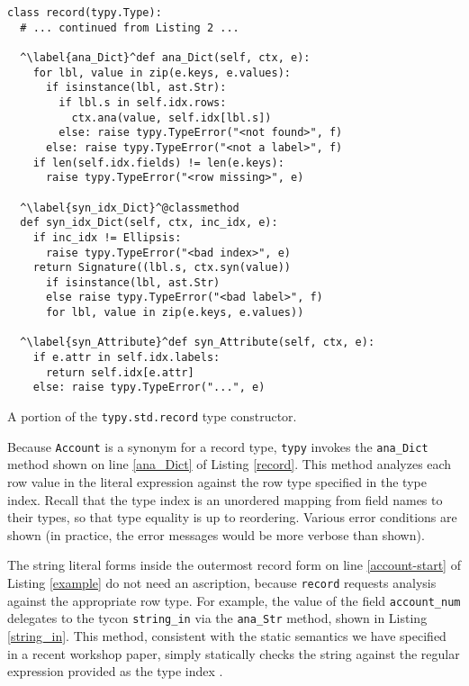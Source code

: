 \documentclass[preprint,10pt]{sigplanconf}
\newcommand{\lip}[1]{\lstinline[language=Python,basicstyle=\ttfamily\small,deletendkeywords={tuple,buffer,map}]{#1}}
\begin{document}
\begin{codelisting}[t]
\begin{lstlisting}
class record(typy.Type): 
  # ... continued from Listing 2 ...

  ^\label{ana_Dict}^def ana_Dict(self, ctx, e):
    for lbl, value in zip(e.keys, e.values):
      if isinstance(lbl, ast.Str):
        if lbl.s in self.idx.rows: 
          ctx.ana(value, self.idx[lbl.s])
        else: raise typy.TypeError("<not found>", f)
      else: raise typy.TypeError("<not a label>", f)
    if len(self.idx.fields) != len(e.keys): 
      raise typy.TypeError("<row missing>", e)

  ^\label{syn_idx_Dict}^@classmethod
  def syn_idx_Dict(self, ctx, inc_idx, e):
    if inc_idx != Ellipsis: 
      raise typy.TypeError("<bad index>", e)
    return Signature((lbl.s, ctx.syn(value))
      if isinstance(lbl, ast.Str)
      else raise typy.TypeError("<bad label>", f)
      for lbl, value in zip(e.keys, e.values))

  ^\label{syn_Attribute}^def syn_Attribute(self, ctx, e):
    if e.attr in self.idx.labels: 
      return self.idx[e.attr]
    else: raise typy.TypeError("...", e)
\end{lstlisting}
%
\caption{A portion of the \texttt{typy.std.record} type constructor.}
\label{record}
\end{codelisting}

Because \lip{Account} is a synonym for a record type, \verb|typy| invokes the \lip{ana_Dict} method shown on line \ref{ana_Dict} of Listing \ref{record}. This method analyzes each row value in the literal expression against the row type specified in the type index. Recall that the type index is an unordered mapping from field names to their types, so that type equality is up to reordering. Various error conditions are shown (in practice, the error messages would be more verbose than shown).

The string literal forms inside the outermost record form on line \ref{account-start} of Listing \ref{example} do not need an ascription, because \lip{record} requests analysis against the appropriate row type. For example, the value of the field \lip{account_num} delegates to the tycon \lip{string_in} via the \lip{ana_Str} method, shown in Listing \ref{string_in}. This method, consistent with the static semantics we have specified in a recent workshop paper, simply statically checks the string against the regular expression provided as the type index \cite{sanitation-psp14}.
\end{document}
